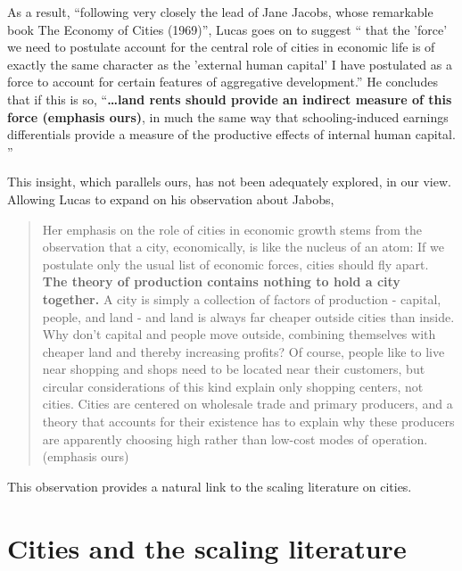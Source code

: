 As a result, ``following very closely the lead of Jane Jacobs, whose remarkable book The Economy of Cities (1969)'', Lucas goes on to suggest `` that the 'force' we need to postulate account for the central role of cities in economic life is of exactly the same character as the 'external human capital' I have postulated as a force to account for certain features of aggregative development.''  He concludes that if this is so, ``\textbf{\dots land rents should provide an indirect measure of this force (emphasis  ours)}, in much the same way that schooling-induced earnings differentials provide a measure of the productive effects of internal human capital. ''

This insight, which parallels ours, has not been adequately explored, in our view.  Allowing Lucas to expand on his observation about Jabobs, 



\begin{quotation}
    Her emphasis on the role of cities in economic growth stems from the observation that a city, economically, is like the nucleus of an atom: If we postulate only the usual list of economic forces, cities should fly apart. \textbf{The theory of production contains nothing to hold a city together.} A city is simply a collection of factors of production - capital, people, and land - and land is always far cheaper outside cities than inside. Why don't capital and people move outside, combining themselves with cheaper land and thereby increasing profits? Of course, people like to live near shopping and shops need to be located near their customers, but circular considerations of this kind explain only shopping centers, not cities. Cities are centered on wholesale trade and primary producers, and a theory that accounts for their existence has to explain why these producers are apparently choosing high rather than low-cost modes of operation. (emphasis ours)
\end{quotation}

This observation provides a natural link to the scaling literature on cities.



\section{Cities and the scaling literature}


